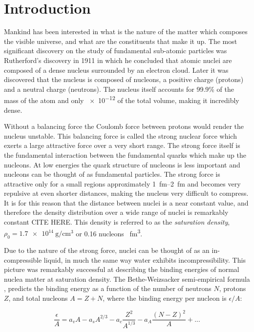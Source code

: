 \chapter{Introduction}
Mankind has been interested in what is the nature of the matter which composes the visible universe, and what are the constituents that make it up. The most significant discovery on the study of fundamental sub-atomic particles was Rutherford's discovery in 1911 in which he concluded that atomic nuclei are composed of a dense nucleus surrounded by an electron cloud. Later it was discovered that the nucleus is composed of nucleons, a positive charge (protons) and a neutral charge (neutrons). The nucleus itself accounts for 99.9\% of the mass of the atom and only \num{e-12} of the total volume, making it incredibly dense. 

Without a balancing force the Coulomb force between protons would render the nucleus unstable. This balancing force is called the strong nuclear force which exerts a large attractive force over a very short range. The strong force itself is the fundamental interaction between the fundamental quarks which make up the nucleons. At low energies the quark structure of nucleons is less important and nucleons can be thought of as fundamental particles. The strong force is attractive only for a small regions approximately \SIrange{1}{2}{\femto\metre} and becomes very repulsive at even shorter distances, making the nucleus very difficult to compress. It is for this reason that the distance between nuclei is a near constant value, and therefore the density distribution over a wide range of nuclei is remarkably constant CITE HERE. This density is referred to as the  \emph{saturation density}, $\rho_0 = \SI{1.7e14}{\gram\per\centi\metre\cubed}$ or \num{0.16} nucleons \si{\per\femto\metre\cubed}.  

Due to the nature of the strong force, nuclei can be thought of as an in-compressible liquid, in much the same way water exhibits incompressibility. This picture was remarkably successful at describing the binding energies of normal nuclea matter at saturation density. The Bethe-Weizsacker semi-empirical formula \cite{awayforward}, predicts the binding energy as a function of the number of neutrons $N$, protons $Z$, and total nucleons $A = Z + N$, where the binding energy per nucleon is $\epsilon/A$:
 
\begin{equation}
\frac{\epsilon}{A} = a_vA - a_s A^{2/3} - a_c \frac{Z^2}{A^{1/3}} - a_A\frac{(N - Z)^2}{A} + ...
\label{eq:semiEmp}
\end{equation}

